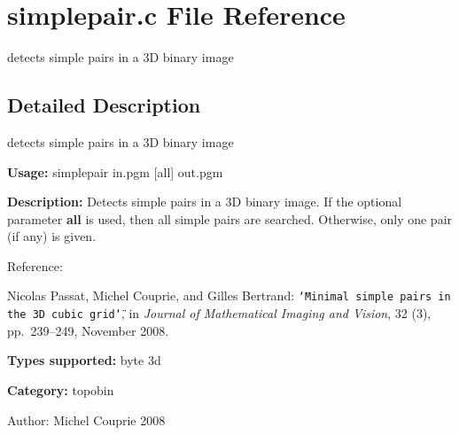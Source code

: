 \section{simplepair.c File Reference}
\label{simplepair_8c}
detects simple pairs in a 3D binary image 



\subsection{Detailed Description}
detects simple pairs in a 3D binary image 

{\bf Usage:} simplepair in.pgm [all] out.pgm

{\bf Description:} Detects simple pairs in a 3D binary image. If the optional parameter {\bf all} is used, then all simple pairs are searched. Otherwise, only one pair (if any) is given.

Reference:\par
 [PCB08] Nicolas Passat, Michel Couprie, and Gilles Bertrand: {\tt \char`\"{}Minimal simple pairs in the 3D cubic grid\char`\"{}}, in {\em Journal of Mathematical Imaging and Vision\/}, 32 (3), pp.~239–249, November 2008.\par


{\bf Types supported:} byte 3d

{\bf Category:} topobin

\begin{Desc}
\item[Author:]Michel Couprie 2008 \end{Desc}
